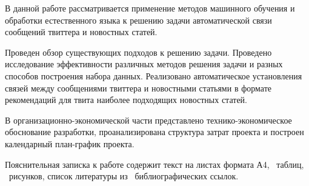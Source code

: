 \summarytitle

В данной работе рассматривается применение методов машинного обучения и обработки естественного языка к решению задачи автоматической связи сообщений твиттера и новостных статей.

Проведен обзор существующих подходов к решению задачи.
Проведено исследование эффективности различных методов решения задачи и разных способов построения набора данных.
Реализовано автоматическое установления связей между сообщениями твиттера и новостными статьями в формате рекомендаций для твита наиболее подходящих новостных статей.

В организационно-экономической части представлено технико-экономическое обоснование разработки, проанализирована структура затрат проекта и построен календарный план-график проекта.

Пояснительная записка к работе содержит текст на \pageref{LastPage} листах формата А4,  \totfig~таблиц, \tottab~рисунков, список литературы из \totbibref~библиографических ссылок.
